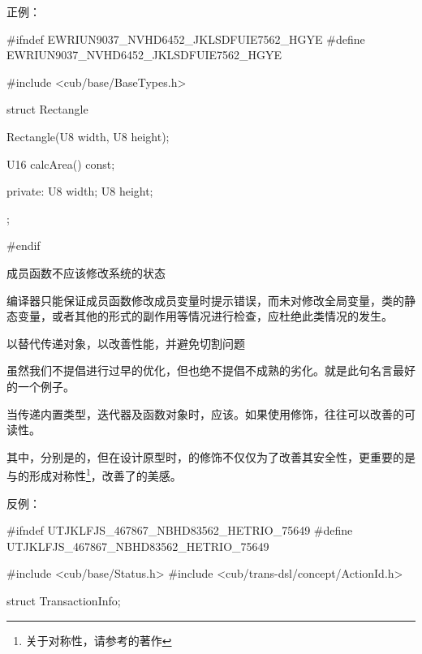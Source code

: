 \begin{content}
正例：
\begin{leftbar}
\begin{c++}[caption={math/Rectangle.h}]
#ifndef EWRIUN9037_NVHD6452_JKLSDFUIE7562_HGYE
#define EWRIUN9037_NVHD6452_JKLSDFUIE7562_HGYE

#include <cub/base/BaseTypes.h>

struct Rectangle
{
    Rectangle(U8 width, U8 height);

    U16 calcArea() const;

private:
    U8 width;
    U8 height;
};

#endif
\end{c++}
\end{leftbar}

\begin{advise}
成员函数不应该修改系统的状态
\end{advise}

编译器只能保证成员函数修改成员变量时提示错误，而未对修改全局变量，类的静态变量，或者其他的形式的副作用等情况进行检查，应杜绝此类情况的发生。

\begin{regulation}
以替代传递对象，以改善性能，并避免切割问题
\end{regulation}

虽然我们不提倡进行过早的优化，但也绝不提倡不成熟的劣化。就是此句名言最好的一个例子。

\begin{advise}
当传递内置类型，迭代器及函数对象时，应该。如果使用修饰，往往可以改善的可读性。
\end{advise}

其中，分别是的，但在设计原型时，的修饰不仅仅为了改善其安全性，更重要的是与的形成对称性\footnote{关于对称性，请参考的著作}，改善了的美感。

反例：
\begin{leftbar}
\begin{c++}[caption={trans-dsl/listener/TransactionListener.h}]
#ifndef UTJKLFJS_467867_NBHD83562_HETRIO_75649
#define UTJKLFJS_467867_NBHD83562_HETRIO_75649

#include <cub/base/Status.h>
#include <cub/trans-dsl/concept/ActionId.h>

struct TransactionInfo;


\end{c++}
\end{leftbar}
\end{content}
